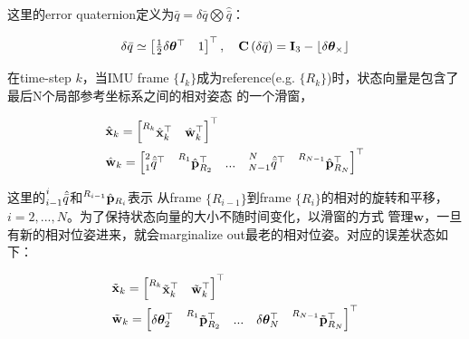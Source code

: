 \documentclass[a4paper, UTF8, fontset=adobe]{ctexart}
\begin{document}
\noindent 这里的error quaternion定义为$\bar{q} = \delta\bar{q} \bigotimes \hat{\bar{q}}$：

\begin{equation}
\numberwithin{equation}{section}
\delta\bar{q} \simeq \begin{bmatrix} \frac{1}{2} \delta\bm{\theta}^{\top} & 1 \end{bmatrix}^{\top}, \\
\quad \mathbf{C}\left(\delta\bar{q}\right) = \mathbf{I}_3 - \lfloor \delta\bm{\theta}_{\times} \rfloor
\end{equation}
	
在time-step $k$，当IMU frame $\{I_k\}$成为reference(e.g. $\{R_k\}$)时，状态向量是包含了最后N个局部参考坐标系之间的相对姿态
的一个滑窗，

\begin{equation}
\begin{aligned}
\numberwithin{equation}{section}
& \hat{\mathbf{x}}_k = \begin{bmatrix} \prescript{R_k}{}{\hat{\mathbf{x}}^{\top}_k} & 
\hat{\mathbf{w}}^{\top}_k \end{bmatrix}^{\top} \\
& \hat{\mathbf{w}}_k = \begin{bmatrix} \prescript{2}{1}{\hat{\bar{q}}^{\top}} & 
\prescript{R_1}{}{\hat{\mathbf{p}}^{\top}_{R_2}} & {...} & \prescript{N\quad}{N-1}{\hat{\bar{q}}^{\top}} &
\prescript{R_{N-1}}{}{\hat{\mathbf{p}}^{\top}_{R_N}} \end{bmatrix}^{\top} 
\end{aligned}
\end{equation}

\noindent 这里的$\prescript{i\quad}{i-1}{\hat{\bar{q}}}$和$\prescript{R_{i-1}}{}{\hat{\mathbf{p}}_{R_i}}$表示
从frame $\{R_{i-1}\}$到frame $\{R_i\}$的相对的旋转和平移，$i=2,...,N$。为了保持状态向量的大小不随时间变化，以滑窗的方式
管理$\mathbf{w}$，一旦有新的相对位姿进来，就会marginalize out最老的相对位姿。对应的误差状态如下：

\begin{equation}
\begin{aligned}
\numberwithin{equation}{section}
& \tilde{\mathbf{x}}_k = \begin{bmatrix} \prescript{R_k}{}{\tilde{\mathbf{x}}^{\top}_k} & 
\tilde{\mathbf{w}}^{\top}_k \end{bmatrix}^{\top} \\
& \tilde{\mathbf{w}}_k = \begin{bmatrix} \delta\bm{\theta}_2^{\top} & 
\prescript{R_1}{}{\tilde{\mathbf{p}}^{\top}_{R_2}} & {...} & \delta\bm{\theta}_N^{\top} &
\prescript{R_{N-1}}{}{\tilde{\mathbf{p}}^{\top}_{R_N}} \end{bmatrix}^{\top} 
\end{aligned}
\end{equation}
\end{document}
